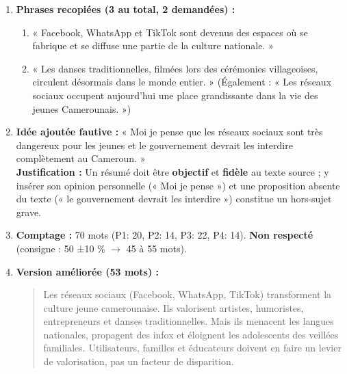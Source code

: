 \documentclass[11pt]{article}
\begin{document}
\begin{corrige}
\begin{enumerate}
\item \textbf{Phrases recopiées (3 au total, 2 demandées) :}
\begin{enumerate}
\item « Facebook, WhatsApp et TikTok sont devenus des espaces où se fabrique et se diffuse une partie de la culture nationale. »
\item « Les danses traditionnelles, filmées lors des cérémonies villageoises, circulent désormais dans le monde entier. »
(Également : « Les réseaux sociaux occupent aujourd'hui une place grandissante dans la vie des jeunes Camerounais. »)
\end{enumerate}
\item \textbf{Idée ajoutée fautive :} « Moi je pense que les réseaux sociaux sont très dangereux pour les jeunes et le gouvernement devrait les interdire complètement au Cameroun. »\\
\textbf{Justification :} Un résumé doit être \textbf{objectif} et \textbf{fidèle} au texte source ; y insérer son opinion personnelle (« Moi je pense ») et une proposition absente du texte (« le gouvernement devrait les interdire ») constitue un hors-sujet grave.
\item \textbf{Comptage :} 70 mots (P1: 20, P2: 14, P3: 22, P4: 14). \textbf{Non respecté} (consigne : 50 ±10 \% $\rightarrow$ 45 à 55 mots).
\item \textbf{Version améliorée (53 mots) :}
\begin{quote}
Les réseaux sociaux (Facebook, WhatsApp, TikTok) transforment la culture jeune camerounaise. Ils valorisent artistes, humoristes, entrepreneurs et danses traditionnelles. Mais ils menacent les langues nationales, propagent des infox et éloignent les adolescents des veillées familiales. Utilisateurs, familles et éducateurs doivent en faire un levier de valorisation, pas un facteur de disparition.
\end{quote}
\end{enumerate}
\end{corrige}
\end{document}
